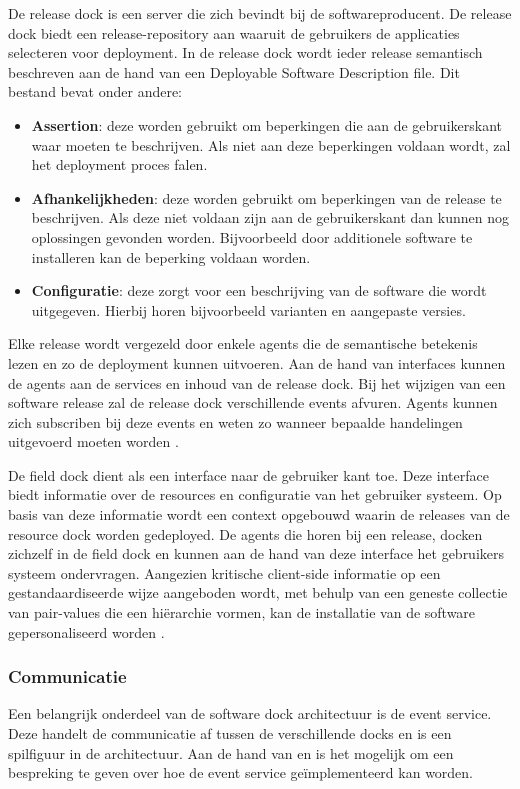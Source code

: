 De release dock is een server die zich bevindt bij de softwareproducent.
De release dock biedt een release-repository aan waaruit de gebruikers de applicaties selecteren voor deployment.
In de release dock wordt ieder release semantisch beschreven aan de hand van een Deployable Software Description file.
Dit bestand bevat onder andere:
\begin{itemize}
\item \textbf{Assertion}: deze worden gebruikt om beperkingen die aan de gebruikerskant waar moeten te beschrijven.
Als niet aan deze beperkingen voldaan wordt, zal het deployment proces falen.
\item \textbf{Afhankelijkheden}: deze worden gebruikt om beperkingen van de release te beschrijven.
Als deze niet voldaan zijn aan de gebruikerskant dan kunnen nog oplossingen gevonden worden.
Bijvoorbeeld door additionele software te installeren kan de beperking voldaan worden.
\item \textbf{Configuratie}: deze zorgt voor een beschrijving van de software die wordt uitgegeven.
Hierbij horen bijvoorbeeld varianten en aangepaste versies.
\end{itemize}
Elke release wordt vergezeld door enkele agents die de semantische betekenis lezen en zo de deployment kunnen uitvoeren.
Aan de hand van interfaces kunnen de agents aan de services en inhoud van de release dock.
Bij het wijzigen van een software release zal de release dock verschillende events afvuren.
Agents kunnen zich subscriben bij deze events en weten zo wanneer bepaalde handelingen uitgevoerd moeten worden \citep{hall1999cooperative}.

De field dock dient als een interface naar de gebruiker kant toe.
Deze interface biedt informatie over de resources en configuratie van het gebruiker systeem.
Op basis van deze informatie wordt een context opgebouwd waarin de releases van de resource dock worden gedeployed.
De agents die horen bij een release, docken zichzelf in de field dock en kunnen aan de hand van deze interface het gebruikers systeem ondervragen.
Aangezien kritische client-side informatie op een gestandaardiseerde wijze aangeboden wordt, met behulp van een geneste collectie van pair-values die een hiërarchie vormen, kan de installatie van de software gepersonaliseerd worden \citep{hall1999cooperative}.

\subsubsection{Communicatie}\label{sec:event}
Een belangrijk onderdeel van de software dock architectuur is de event service.
Deze handelt de communicatie af tussen de verschillende docks en is een spilfiguur in de architectuur.
Aan de hand van \citet{pietzuch2002hermes} en \citet{carzaniga2001design} is het mogelijk om een bespreking te geven over hoe de event service geïmplementeerd kan worden.

